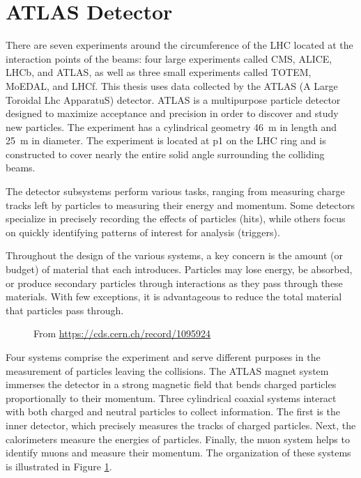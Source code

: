 \section{ATLAS Detector}
There are seven experiments around the circumference of the LHC located at the interaction points of the beams: four large experiments called CMS, ALICE, LHCb, and ATLAS, as well as three small experiments called TOTEM, MoEDAL, and LHCf.
This thesis uses data collected by the ATLAS (A Large Toroidal Lhc ApparatuS) detector.
ATLAS is a multipurpose particle detector designed to maximize acceptance and precision in order to discover and study new particles.
The experiment has a cylindrical geometry 46~m in length and 25~m in diameter.
The experiment is located at p1 on the LHC ring and is constructed to cover nearly the entire solid angle surrounding the colliding beams. \cite{atlasFacts}

The detector subsystems perform various tasks, ranging from measuring charge tracks left by particles to measuring their energy and momentum.
Some detectors specialize in precisely recording the effects of particles (hits), while others focus on quickly identifying patterns of interest for analysis (triggers).

Throughout the design of the various systems, a key concern is the amount (or budget) of material that each introduces.
Particles may lose energy, be absorbed, or produce secondary particles through interactions as they pass through these materials.
With few exceptions, it is advantageous to reduce the total material that particles pass through.

\begin{figure}[h!]
\captionsetup[subfigure]{position=b}
\centering
{}
\caption{From \url{https://cds.cern.ch/record/1095924}}
\label{fig:atlasLayout}
\end{figure}

Four systems comprise the experiment and serve different purposes in the measurement of particles leaving the collisions.
The ATLAS magnet system immerses the detector in a strong magnetic field that bends charged particles proportionally to their momentum.
Three cylindrical coaxial systems interact with both charged and neutral particles to collect information.
The first is the inner detector, which precisely measures the tracks of charged particles.
Next, the calorimeters measure the energies of particles.
Finally, the muon system helps to identify muons and measure their momentum.
The organization of these systems is illustrated in Figure \ref{fig:atlasLayout}.

